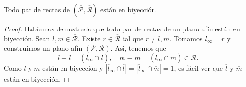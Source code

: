 \begin{colorary}
Todo par de rectas de $\displaystyle \left(\overline{\mathcal{P}}, \overline{\mathcal{R}}\right) $ están en biyección.
\end{colorary}
\begin{proof}
Habíamos demostrado que todo par de rectas de un plano afín están en biyección. Sean $\displaystyle \overline{l}, \overline{m} \in \overline{\mathcal{R}} $. Existe $\displaystyle \overline{r} \in \overline{\mathcal{R}} $ tal que $\displaystyle \overline{r} \neq \overline{l}, \overline{m} $. Tomamos $\displaystyle \overline{l}_{\infty} = \overline{r} $ y construimos un plano afín $\displaystyle \left(\mathcal{P}, \mathcal{R}\right) $. Así, tenemos que 
\[l = \overline{l} - \left(\overline{l}_{\infty} \cap \overline{l}\right), \quad m = \overline{m} - \left(\overline{l}_{\infty} \cap \overline{m}\right) \in \mathcal{R} .\]
Como $\displaystyle l $ y $\displaystyle m $ están en biyección y $\displaystyle \left|\overline{l}_{\infty}\cap \overline{l}\right| = \left|\overline{l}_{\infty} \cap \overline{m}\right| = 1 $, es fácil ver que $\displaystyle \overline{l}  $ y $\displaystyle \overline{m} $ están en biyección.
\end{proof}
